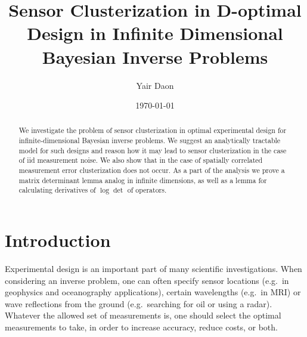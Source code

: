 \documentclass{amsart}
\numberwithin{equation}{section}
\begin{document}
\title[Sensor Clusterization in D-optimal design in infinite
  dimensions]{Sensor Clusterization in D-optimal Design in Infinite
  Dimensional Bayesian Inverse Problems}

\author{Yair Daon}
\address{Porter School of the Environment and Earth
  Sciences, Tel Aviv University\\ Tel Aviv, Israel}

\date{\today}

\begin{abstract}
  We investigate the problem of sensor clusterization in optimal
  experimental design for infinite-dimensional Bayesian inverse
  problems. We suggest an analytically tractable model for such
  designs and reason how it may lead to sensor clusterization in the
  case of iid measurement noise. We also show that in the case of
  spatially correlated measurement error clusterization does not
  occur. As a part of the analysis we prove a matrix determinant
  lemma analog in infinite dimensions, as well as a lemma for
  calculating derivatives of $\log \det$ of operators.
\end{abstract}

\maketitle

\section{Introduction}\label{section:OED intro}
Experimental design is an important part of many scientific
investigations. When considering an inverse problem, one can often
specify sensor locations (e.g.\ in geophysics and oceanography
applications), certain wavelengths (e.g.\ in MRI) or wave reflections
from the ground (e.g.\ searching for oil or using a radar). Whatever
the allowed set of measurements is, one should select the optimal
measurements to take, in order to increase accuracy, reduce costs, or
both.
\end{document}
